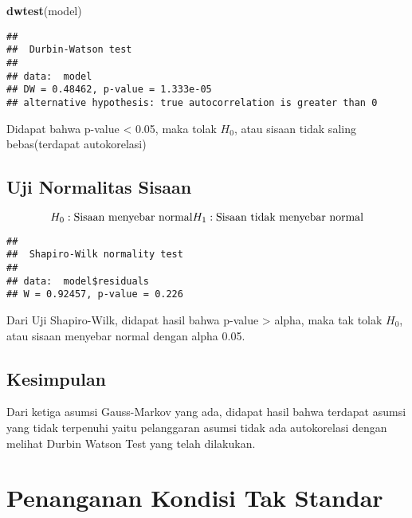 \documentclass[
]{article}
\newenvironment{Shaded}{\begin{snugshade}}{\end{snugshade}}
\newcommand{\FunctionTok}[1]{\textcolor[rgb]{0.13,0.29,0.53}{\textbf{#1}}}
\newcommand{\NormalTok}[1]{#1}
\newcommand{\SpecialCharTok}[1]{\textcolor[rgb]{0.81,0.36,0.00}{\textbf{#1}}}
\begin{document}
\begin{Shaded}
\begin{Highlighting}[]
\FunctionTok{dwtest}\NormalTok{(model)}
\end{Highlighting}
\end{Shaded}

\begin{verbatim}
## 
##  Durbin-Watson test
## 
## data:  model
## DW = 0.48462, p-value = 1.333e-05
## alternative hypothesis: true autocorrelation is greater than 0
\end{verbatim}

Didapat bahwa p-value \textless{} 0.05, maka tolak \(H_0\), atau sisaan
tidak saling bebas(terdapat autokorelasi)

\hypertarget{uji-normalitas-sisaan}{%
\subsection{Uji Normalitas Sisaan}\label{uji-normalitas-sisaan}}

\[
H_0 : \text{Sisaan menyebar normal}\\H_1 : \text{Sisaan tidak menyebar normal}
\]

\begin{Shaded}
\end{Shaded}

\begin{verbatim}
## 
##  Shapiro-Wilk normality test
## 
## data:  model$residuals
## W = 0.92457, p-value = 0.226
\end{verbatim}

Dari Uji Shapiro-Wilk, didapat hasil bahwa p-value \textgreater{} alpha,
maka tak tolak \(H_0\), atau sisaan menyebar normal dengan alpha 0.05.

\hypertarget{kesimpulan}{%
\subsection{Kesimpulan}\label{kesimpulan}}

Dari ketiga asumsi Gauss-Markov yang ada, didapat hasil bahwa terdapat
asumsi yang tidak terpenuhi yaitu pelanggaran asumsi tidak ada
autokorelasi dengan melihat Durbin Watson Test yang telah dilakukan.

\hypertarget{penanganan-kondisi-tak-standar}{%
\section{Penanganan Kondisi Tak
Standar}\label{penanganan-kondisi-tak-standar}}
\end{document}
